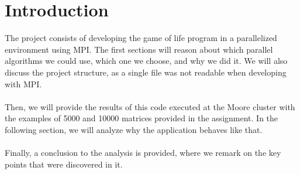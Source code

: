 \documentclass[11pt, a4paper]{article}
\begin{document}
	\section{Introduction}
	
	The project consists of developing the game of life program in a parallelized environment using MPI. The first sections will reason about which parallel algorithms we could use, which one we choose, and why we did it. We will also discuss the project structure, as a single file was not readable when developing with MPI. \\
	\\
	Then, we will provide the results of this code executed at the Moore cluster with the examples of 5000 and 10000 matrices provided in the assignment. In the following section, we will analyze why the application behaves like that.\\
	\\
	Finally, a conclusion to the analysis is provided, where we remark on the key points that were discovered in it.
\end{document}
